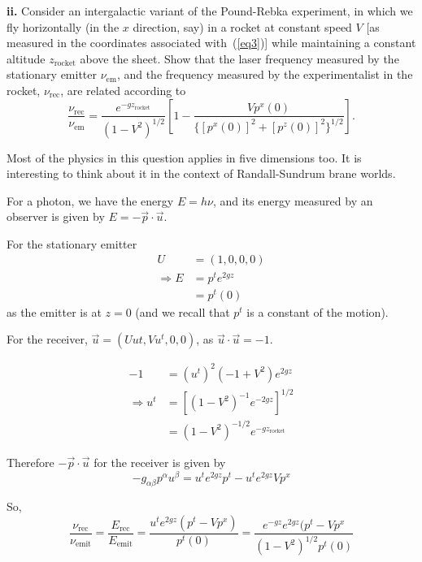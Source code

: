 \documentclass[a4paper]{article} %
\begin{document}
\begin{framed}
\textbf{ii.} Consider an intergalactic variant of the Pound-Rebka experiment, in which we fly horizontally (in the $x$ direction, say) in a rocket at constant speed $V$ [as measured in the coordinates associated with~(\ref{eq3})] while maintaining a constant altitude $z_{\text{rocket}}$ above the sheet. Show that the laser frequency measured by the stationary emitter $\nu_{\text{em}}$, and the frequency measured by the experimentalist in the rocket, $\nu_{\text{rec}}$, are related according to
\begin{equation}
\frac{\nu_{\text{rec}}}{\nu_{\text{em}}}=\frac{e^{-gz_{\text{rocket}}}}{(1-V^2)^{1/2}}
\left[1-\frac{Vp^x(0)}{\{[p^x(0)]^2+[p^z(0)]^2\}^{1/2}}\right].
\end{equation}

Most of the physics in this question applies in five dimensions too. It is interesting to think about it in the context of Randall-Sundrum brane worlds.
\end{framed}

For a photon, we have the energy $E=h\nu$, and its energy measured by an observer is given by $E=-\vec{p}\cdot \vec{u}$.

For the stationary emitter
\begin{align}
U&=(1,0,0,0)\\
\Rightarrow E&=p^{t}e^{2gz}\\
&=p^t(0)
\end{align}
as the emitter is at $z=0$ (and we recall that $p^t$ is a constant of the motion).

For the receiver, $\vec{u}=(Uut,Vu^t,0,0)$, as $\vec{u}\cdot\vec{u}=-1$.

\begin{align}
-1&=(u^t)^2(-1+V^2)e^{2gz}\\
\Rightarrow u^t&=\left[(1-V^2)^{-1}e^{-2gz}\right]^{1/2}\\
&=(1-V^2)^{-1/2} e^{-gz_{\text{rocket}}}
\end{align}

Therefore $-\vec{p}\cdot\vec{u}$ for the receiver is given by
\begin{equation}
-g_{\alpha\beta}p^{\alpha}u^{\beta}=u^{t}e^{2gz}p^t - u^t e^{2gz} V p^{x}
\end{equation}

So,
\begin{equation}
\frac{\nu_{\text{rec}}}{\nu_{\text{emit}}}=\frac{E_{\text{rec}}}{E_{\text{emit}}}
=\frac{u^t e^{2gz}(p^{t}-Vp^{x})}{p^{t}(0)}
=\frac{e^{-gz}e^{2gz}(p^{t}-Vp^{x}}{(1-V^2)^{1/2}p^{t}(0)}
\end{equation}
\end{document}
